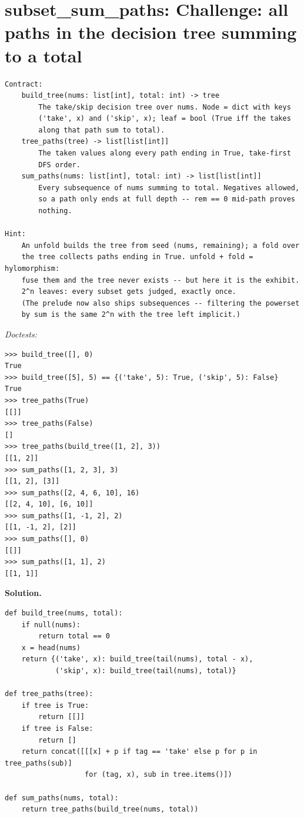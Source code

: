 \documentclass[11pt,letterpaper]{book}
\begin{document}
\section{subset\_sum\_paths: Challenge: all paths in the decision tree summing to a total}
\begin{lstlisting}[style=spec]
Contract:
    build_tree(nums: list[int], total: int) -> tree
        The take/skip decision tree over nums. Node = dict with keys
        ('take', x) and ('skip', x); leaf = bool (True iff the takes
        along that path sum to total).
    tree_paths(tree) -> list[list[int]]
        The taken values along every path ending in True, take-first
        DFS order.
    sum_paths(nums: list[int], total: int) -> list[list[int]]
        Every subsequence of nums summing to total. Negatives allowed,
        so a path only ends at full depth -- rem == 0 mid-path proves
        nothing.

Hint:
    An unfold builds the tree from seed (nums, remaining); a fold over
    the tree collects paths ending in True. unfold + fold = hylomorphism:
    fuse them and the tree never exists -- but here it is the exhibit.
    2^n leaves: every subset gets judged, exactly once.
    (The prelude now also ships subsequences -- filtering the powerset
    by sum is the same 2^n with the tree left implicit.)
\end{lstlisting}
\noindent\textit{Doctests:}
\begin{lstlisting}[style=spec]
>>> build_tree([], 0)
True
>>> build_tree([5], 5) == {('take', 5): True, ('skip', 5): False}
True
>>> tree_paths(True)
[[]]
>>> tree_paths(False)
[]
>>> tree_paths(build_tree([1, 2], 3))
[[1, 2]]
>>> sum_paths([1, 2, 3], 3)
[[1, 2], [3]]
>>> sum_paths([2, 4, 6, 10], 16)
[[2, 4, 10], [6, 10]]
>>> sum_paths([1, -1, 2], 2)
[[1, -1, 2], [2]]
>>> sum_paths([], 0)
[[]]
>>> sum_paths([1, 1], 2)
[[1, 1]]
\end{lstlisting}
\noindent\textbf{Solution.}
\begin{lstlisting}[style=code]
def build_tree(nums, total):
    if null(nums):
        return total == 0
    x = head(nums)
    return {('take', x): build_tree(tail(nums), total - x),
            ('skip', x): build_tree(tail(nums), total)}

def tree_paths(tree):
    if tree is True:
        return [[]]
    if tree is False:
        return []
    return concat([[[x] + p if tag == 'take' else p for p in tree_paths(sub)]
                   for (tag, x), sub in tree.items()])

def sum_paths(nums, total):
    return tree_paths(build_tree(nums, total))
\end{lstlisting}
\end{document}
